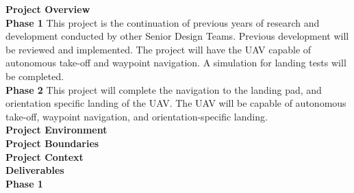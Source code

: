 \vspace{6mm}
\Large{\textbf{Project Overview}}
\\[-3mm]\noindent\makebox[\linewidth]{\rule{\textwidth}{0.4pt}}
\Large{\textbf{Phase 1}}
This project is the continuation of previous years of research and development conducted by other Senior Design Teams. Previous development will be reviewed and implemented. The project will have the UAV capable of autonomous take-off and waypoint navigation. A simulation for landing tests will be completed.
\\[3mm]
\Large{\textbf{Phase 2}}
This project will complete the navigation to the landing pad, and orientation specific landing of the UAV. The UAV will be capable of autonomous take-off, waypoint navigation, and orientation-specific landing.
\\[10mm]
\Large{\textbf{Project Environment}}
\\[-3mm]\noindent\makebox[\linewidth]{\rule{\textwidth}{0.4pt}}
\Large{\textbf{Project Boundaries}}
\\[3mm]
\Large{\textbf{Project Context}}
\\[10mm]
\Large{\textbf{Deliverables}}
\\[-3mm]\noindent\makebox[\linewidth]{\rule{\textwidth}{0.4pt}}
\Large{\textbf{Phase 1}}
